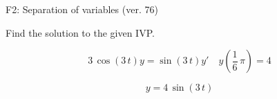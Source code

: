 \begin{exercise}
  \begin{exerciseTitle}F2: Separation of variables (ver. 76)\end{exerciseTitle}
  \begin{exerciseStatement}
    
Find the solution to the given IVP.

    
\[3 \, \cos\left(3 \, t\right) y= \sin\left(3 \, t\right) y'\hspace{1em} y\left( \frac{1}{6} \, \pi \right)= 4\]

  \end{exerciseStatement}
  \begin{exerciseAnswer}
    
\[y= 4 \, \sin\left(3 \, t\right)\]

  \end{exerciseAnswer}
\end{exercise}